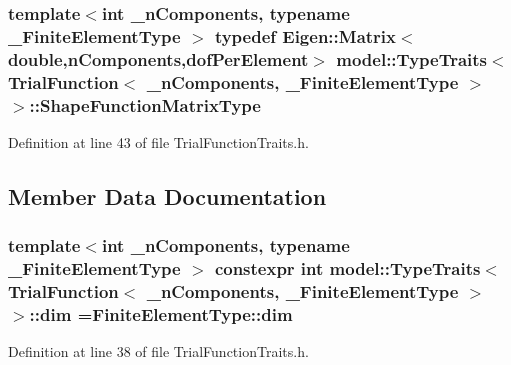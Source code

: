 \subsubsection[{Shape\+Function\+Matrix\+Type}]{\setlength{\rightskip}{0pt plus 5cm}template$<$int \+\_\+n\+Components, typename \+\_\+\+Finite\+Element\+Type $>$ typedef Eigen\+::\+Matrix$<$double,{\bf n\+Components},{\bf dof\+Per\+Element}$>$ {\bf model\+::\+Type\+Traits}$<$ {\bf Trial\+Function}$<$ \+\_\+n\+Components, \+\_\+\+Finite\+Element\+Type $>$ $>$\+::{\bf Shape\+Function\+Matrix\+Type}}\label{structmodel_1_1_type_traits_3_01_trial_function_3_01__n_components_00_01___finite_element_type_01_4_01_4_afc8be749eb30a3f28ce8cca5c90d3c10}


Definition at line 43 of file Trial\+Function\+Traits.\+h.



\subsection{Member Data Documentation}
\hypertarget{structmodel_1_1_type_traits_3_01_trial_function_3_01__n_components_00_01___finite_element_type_01_4_01_4_a0e102b33c745ebd14f62d11dd9af9f08}{}
\subsubsection[{dim}]{\setlength{\rightskip}{0pt plus 5cm}template$<$int \+\_\+n\+Components, typename \+\_\+\+Finite\+Element\+Type $>$ constexpr int {\bf model\+::\+Type\+Traits}$<$ {\bf Trial\+Function}$<$ \+\_\+n\+Components, \+\_\+\+Finite\+Element\+Type $>$ $>$\+::dim =Finite\+Element\+Type\+::dim\hspace{0.3cm}{\ttfamily [static]}}\label{structmodel_1_1_type_traits_3_01_trial_function_3_01__n_components_00_01___finite_element_type_01_4_01_4_a0e102b33c745ebd14f62d11dd9af9f08}


Definition at line 38 of file Trial\+Function\+Traits.\+h.

\hypertarget{structmodel_1_1_type_traits_3_01_trial_function_3_01__n_components_00_01___finite_element_type_01_4_01_4_af917eb0f3f950e58ec3dc6723ace8a3a}{}
